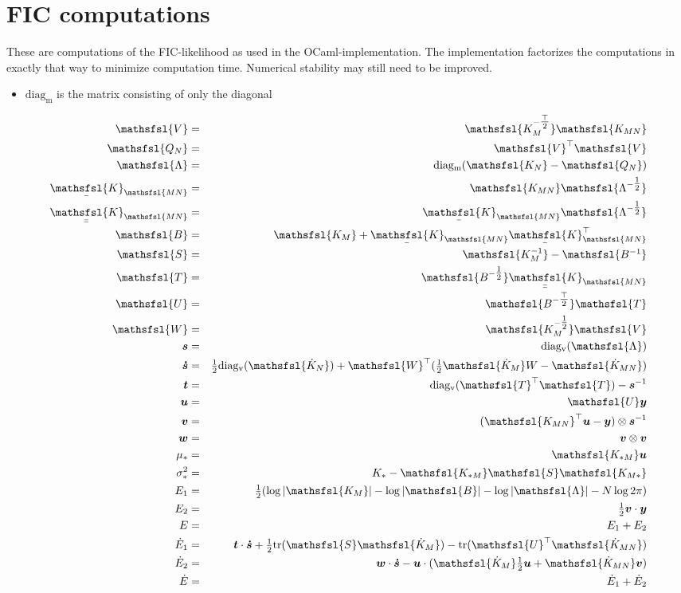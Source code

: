 \documentclass[12pt]{article}
\newcommand{\myu}[1]{\underaccent{\bar}{#1}}
\newcommand{\onehalf}{\tfrac{1}{2}}
\newcommand{\mat}[1]{\mbox{$\mathsfsl{#1}$}}
\renewcommand{\vec}[1]{\mbox{\boldmath$#1$}}
\newcommand{\diagv}[1]{\mathrm{diag_v}(#1)}
\newcommand{\diagm}[1]{\mathrm{diag_m}(#1)}
\newcommand{\trace}[1]{\mathrm{tr}(#1)}
\newcommand{\transm}[1]{\mat{#1}^\top}
\newcommand{\imat}[1]{\mat{#1^{-1}}}
\newcommand{\ichol}[1]{\mat{#1^{-\onehalf}}}
\newcommand{\icholt}[1]{\mat{#1^{-\tfrac{\top}{2}}}}
\newcommand{\Km}{\mat{K_M}}
\newcommand{\dKm}{\mat{\dot{K}_M}}
\newcommand{\dkn}{\mat{\dot{K}_N}}
\newcommand{\Kmn}{\mat{K_{MN}}}
\newcommand{\Knm}{\transm{K_{MN}}}
\newcommand{\uKnm}{\myu{\mat{K}}_{\mathsfsl{MN}}^\top}
\newcommand{\dKmn}{\mat{\dot{K}_{MN}}}
\newcommand{\uKmn}{\myu{\mat{K}}_{\mathsfsl{MN}}}
\newcommand{\uuKmn}{\myu{\myu{\mat{K}}}_{\mathsfsl{MN}}}
\newcommand{\dE}{\dot{E}}
\newcommand{\vecs}{\vec{s}}
\newcommand{\vect}{\vec{t}}
\newcommand{\vecu}{\vec{u}}
\newcommand{\vecv}{\vec{v}}
\newcommand{\vecw}{\vec{w}}
\newcommand{\vecy}{\vec{y}}
\newcommand{\vecsd}{\vec{\dot{s}}}
\newcommand{\vecis}{\vec{s}^{-1}}
\newcommand{\matB}{\mat{B}}
\newcommand{\matS}{\mat{S}}
\newcommand{\matT}{\mat{T}}
\newcommand{\matU}{\mat{U}}
\newcommand{\matV}{\mat{V}}
\newcommand{\matW}{\mat{W}}
\newcommand{\Lam}{\mat{\Lambda}}
\begin{document}
\section{FIC computations}

These are computations of the FIC-likelihood as used in the
OCaml-implementation.  The implementation factorizes the computations
in exactly that way to minimize computation time.  Numerical stability
may still need to be improved.

\begin{itemize}
\item $\mathrm{diag_m}$ is the matrix consisting of only the diagonal
\end{itemize}

\begin{eqnarray*}
\matV & = & \icholt{K_M}\Kmn \\
\mat{Q_N} & = & \transm{V} \matV \\
\Lam & = & \diagm{\mat{K_N} - \mat{Q_N}} \\
\uKmn & = & \Kmn \ichol{\Lambda} \\
\uuKmn & = & \uKmn\ichol{\Lambda} \\
\matB & = & \Km + \uKmn\uKnm \\
\matS & = & \imat{K_M} - \imat{B} \\
\matT & = & \ichol{B}\uuKmn \\
\matU & = & \icholt{B}\matT \\
\matW & = & \ichol{K_M}\mat{V} \\
\vecs & = & \diagv{\Lam} \\
\vecsd & = & \onehalf\diagv{\dkn} + \transm{W}(\onehalf\dKm W - \dKmn) \\
\vect & = & \diagv{\transm{T}\matT} - \vecis \\
\vecu & = & \matU \vecy \\
\vecv & = & (\Knm \vecu - \vecy) \otimes \vecis \\
\vecw & = & \vecv \otimes \vecv \\
\mu_* & = & \mat{K_{*M}} \vecu \\
\sigma^2_* & = & K_* - \mat{K_{*M}}\matS\mat{K_{M*}} \\
E_1 & = & \onehalf (\log|\Km| - \log|\matB| - \log|\Lam| - N \log 2\pi) \\
E_2 & = & \onehalf \vecv\cdot\vecy \\
E & = & E_1 + E_2 \\
\dE_1 & = & \vect\cdot\vecsd + \onehalf\trace{\matS\dKm} - \trace{\transm{U}\dKmn} \\
\dE_2 & = & \vecw\cdot\vecsd - \vecu\cdot(\dKm \onehalf \vecu + \dKmn \vecv) \\
\dE & = & \dE_1 + \dE_2 \\
\end{eqnarray*}
\end{document}
